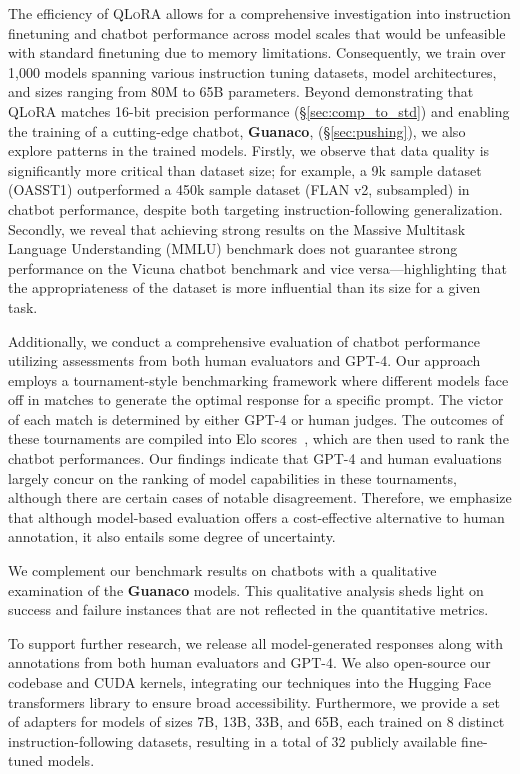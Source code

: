 The efficiency of \textsc{QLoRA} allows for a comprehensive investigation into instruction finetuning and chatbot performance across model scales that would be unfeasible with standard finetuning due to memory limitations. Consequently, we train over 1,000 models spanning various instruction tuning datasets, model architectures, and sizes ranging from 80M to 65B parameters. Beyond demonstrating that \textsc{QLoRA} matches 16-bit precision performance (\S\ref{sec:comp_to_std}) and enabling the training of a cutting-edge chatbot, \textbf{Guanaco}, (\S\ref{sec:pushing}), we also explore patterns in the trained models. Firstly, we observe that data quality is significantly more critical than dataset size; for example, a 9k sample dataset (OASST1) outperformed a 450k sample dataset (FLAN v2, subsampled) in chatbot performance, despite both targeting instruction-following generalization. Secondly, we reveal that achieving strong results on the Massive Multitask Language Understanding (MMLU) benchmark does not guarantee strong performance on the Vicuna chatbot benchmark and vice versa—highlighting that the appropriateness of the dataset is more influential than its size for a given task.

Additionally, we conduct a comprehensive evaluation of chatbot performance utilizing assessments from both human evaluators and GPT-4. Our approach employs a tournament-style benchmarking framework where different models face off in matches to generate the optimal response for a specific prompt. The victor of each match is determined by either GPT-4 or human judges. The outcomes of these tournaments are compiled into Elo scores~\citep{elo1967proposed, elo1978rating}, which are then used to rank the chatbot performances. Our findings indicate that GPT-4 and human evaluations largely concur on the ranking of model capabilities in these tournaments, although there are certain cases of notable disagreement. Therefore, we emphasize that although model-based evaluation offers a cost-effective alternative to human annotation, it also entails some degree of uncertainty.

We complement our benchmark results on chatbots with a qualitative examination of the \textbf{Guanaco} models. This qualitative analysis sheds light on success and failure instances that are not reflected in the quantitative metrics.

To support further research, we release all model-generated responses along with annotations from both human evaluators and GPT-4. We also open-source our codebase and CUDA kernels, integrating our techniques into the Hugging Face transformers library \citep{wolf2019huggingface} to ensure broad accessibility. Furthermore, we provide a set of adapters for models of sizes 7B, 13B, 33B, and 65B, each trained on 8 distinct instruction-following datasets, resulting in a total of 32 publicly available fine-tuned models.

